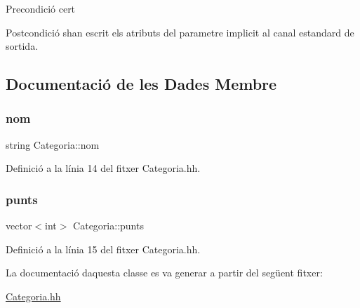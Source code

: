 \begin{DoxyPrecond}{Precondició}
cert 
\end{DoxyPrecond}
\begin{DoxyPostcond}{Postcondició}
s\textquotesingle{}han escrit els atributs del parametre implicit al canal estandard de sortida. 
\end{DoxyPostcond}


\subsection{Documentació de les Dades Membre}
\mbox{\label{class_categoria_ad39955d54081f0d7f31db96909a4f6bf}} 
\subsubsection{\texorpdfstring{nom}{nom}}
{\footnotesize\ttfamily string Categoria\+::nom\hspace{0.3cm}{\ttfamily [private]}}



Definició a la línia 14 del fitxer Categoria.\+hh.

\mbox{\label{class_categoria_a02abd0de204bc833ef030bcf0bc2bbd0}} 
\subsubsection{\texorpdfstring{punts}{punts}}
{\footnotesize\ttfamily vector$<$int$>$ Categoria\+::punts\hspace{0.3cm}{\ttfamily [private]}}



Definició a la línia 15 del fitxer Categoria.\+hh.



La documentació d\textquotesingle{}aquesta classe es va generar a partir del següent fitxer\+:\begin{DoxyCompactItemize}
\item 
\mbox{\hyperlink{_categoria_8hh}{Categoria.\+hh}}\end{DoxyCompactItemize}
